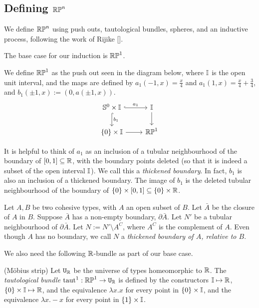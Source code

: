 \documentclass{amsart}
\begin{document}
\subsection{Defining $\mathbb{RP}^n$}
We define $\mathbb{RP}^n$ using push outs, tautological bundles, spheres, and an inductive process, following the work of Rijike [].

The base case for our induction is $\mathbb{RP}^1$.

\begin{definition}
We define $\mathbb{RP}^1$ as the push out seen in the diagram below, where $\mathbb{I}$ is the open unit interval, and the maps are defined by $a_1(-1,x) = \frac{x}{4}$ and $a_1(1,x)= \frac{x}{4} + \frac{3}{4}$, and $b_1 (\pm 1, x) := (0, a(\pm1, x))$.\\
\[\begin{tikzcd}
\set{S}^0 \times \set{I} \arrow[r, hook, "a_1"] \arrow[d, hook, "b_1" ] & \set{I} \arrow[d]\\
\{0 \} \times \set{I} \arrow[r] & \set{RP}^1
\end{tikzcd}
\]
\end{definition}

It is helpful to think of $a_1$ as an inclusion of a tubular neighbourhood of the boundary of $[0,1] \subseteq \mathbb{R}$, with the boundary points deleted (so that it is indeed a subset of the open interval $\mathbb{I}$). We call this a \emph{thickened boundary}. In fact, $b_1$ is also an inclusion of a thickened boundary. The image of $b_1$ is the deleted tubular neighbourhood of the boundary of $\{0\} \times [0,1] \subseteq \{0\} \times \mathbb{R}$.

\begin{definition}
Let $A, B$ be two cohesive types, with $A$ an open subset of $B$. Let $\bar{A}$ be the closure of $A$ in $B$. Suppose $\bar{A}$ has a non-empty boundary, $\partial \bar{A}$. Let $N'$ be a tubular neighbourhood of $\partial\bar{A}$. Let $N := N' \setminus A^C$, where $A^C$ is the complement of $A$. Even though $A$ has no boundary, we call $N$ a \emph{thickened boundary of $A$, relative to $B$}.
\end{definition}

We also need the following $\mathbb{R}$-bundle as part of our base case. 
\begin{definition}(M\"{o}bius strip)
Let $\mathtt{U}_{\mathbb{R}}$ be the universe of types homeomorphic to $\mathbb{R}$. The \emph{tautological bundle} $\text{taut}^1: \mathbb{RP}^1 \rightarrow \mathtt{U}_{\mathbb{R}}$ is defined by the constructors $\mathbb{I} \mapsto \mathbb{R}$, $\{0 \} \times \mathbb{I} \mapsto \mathbb{R}$, and the equivalence $\lambda x. x$ for every point in $\{0\} \times \mathbb{I}$, and the equivalence $\lambda x. -x$ for every point in $\{1\} \times \mathbb{I}$.
\end{definition}
\end{document}
